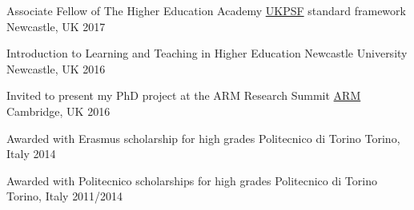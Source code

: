 
\begin{cvhonors}


\cvhonor
{Associate Fellow of The Higher Education Academy} %
{{\color{myblue}\href{https://www.heacademy.ac.uk/ukpsf}{UKPSF}} standard 
framework} %
{Newcastle, UK} %
{2017} %

\cvhonor
{Introduction to Learning and Teaching in Higher Education}
{Newcastle University}
{Newcastle, UK}
{2016}

\cvhonor
{Invited to present my PhD project at the ARM Research Summit}
{\color{myblue}\href{https://developer.arm.com/research/summit/previous-summits/2016/speakers}{ARM}}
{Cambridge, UK}
{2016}

\cvhonor
{Awarded with Erasmus scholarship for high grades}
{Politecnico di Torino}
{Torino, Italy}
{2014}

\cvhonor
{Awarded with Politecnico scholarships for high grades}
{Politecnico di Torino}
{Torino, Italy}
{2011/2014}


\end{cvhonors}